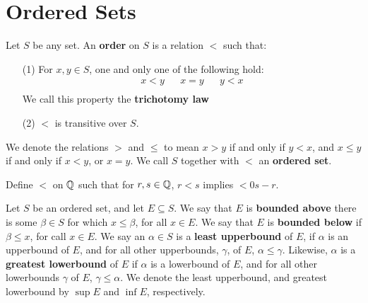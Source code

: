 
\section{Ordered Sets}

\begin{definition}
    Let $S$ be any set. An \textbf{order} on $S$ is a relation  $<$ such that:
        \begin{enumerate}
            \item[(1)] For $x,y \in S$, one and only one of the following hold:
                \begin{align*}
                    x<y && x=y && y<x \\
                \end{align*}
            We call this property the \textbf{trichotomy law}

        \item[(2)] $<$ is transitive over $S$.
        \end{enumerate}
    We denote the relations $>$ and $\leq$ to mean $x>y$ if and only if $y<x$,
    and $x \leq y$ if and only if $x<y$, or $x=y$. We call $S$ together with  $<$
    an \textbf{ordered set}.
\end{definition}

\begin{example}
    Define $<$  on $\mathbb{Q}$ such that for $r,s \in \mathbb{Q}$, $r<s$ implies $<0s-r$.
\end{example}

\begin{definition}
    Let $S$ be an ordered set, and let  $E \subseteq S$. We say that  $E$ is \textbf{bounded above}
    there is some  $\beta \in S$ for which  $x \leq \beta$, for all $x \in E$. We say that $E$
    is  \textbf{bounded below} if  $\beta \leq x$, for call  $x \in E$. We say an $\alpha \in S$ is a
    \textbf{least upperbound} of  $E$, if  $\alpha$ is an upperbound of  $E$, and for all
    other upperbounds,  $\gamma$, of  $E$,  $\alpha \leq \gamma$. Likewise,  $\alpha$ is a \textbf{greatest
    lowerbound}  of $E$ if  $\alpha$ is a lowerbound of  $E$, and for all other lowerbounds
    $\gamma$ of  $E$,  $\gamma \leq \alpha$. We denote the least upperbound, and greatest lowerbound
    by  $\sup{E}$ and  $\inf{E}$, respectively.
\end{definition}

